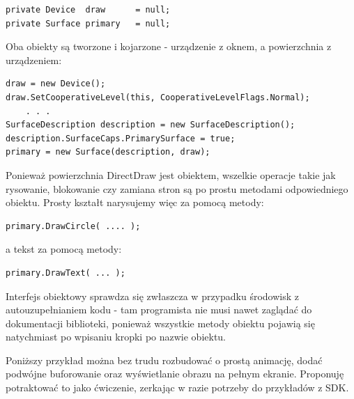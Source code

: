 \begin{scriptsize}
\begin{verbatim}
private Device  draw      = null; 
private Surface primary   = null;
\end{verbatim}
\end{scriptsize}

Oba obiekty są tworzone i kojarzone - urządzenie z oknem, a powierzchnia z urządzeniem:

\begin{scriptsize}
\begin{verbatim}
draw = new Device(); 
draw.SetCooperativeLevel(this, CooperativeLevelFlags.Normal);
	. . .
SurfaceDescription description = new SurfaceDescription(); 
description.SurfaceCaps.PrimarySurface = true; 
primary = new Surface(description, draw);
\end{verbatim}
\end{scriptsize}

Ponieważ powierzchnia DirectDraw jest obiektem, wszelkie operacje takie jak rysowanie, 
blokowanie czy zamiana stron są po prostu metodami odpowiedniego obiektu. 
Prosty kształt narysujemy więc za pomocą metody:

\begin{scriptsize}
\begin{verbatim}
primary.DrawCircle( .... );
\end{verbatim}
\end{scriptsize}

a tekst za pomocą metody:

\begin{scriptsize}
\begin{verbatim}
primary.DrawText( ... );	
\end{verbatim}
\end{scriptsize}

Interfejs obiektowy sprawdza się zwłaszcza w przypadku środowisk z autouzupełnianiem kodu - 
tam programista nie musi nawet zaglądać do dokumentacji biblioteki, ponieważ wszystkie metody 
obiektu pojawią się natychmiast po wpisaniu kropki po nazwie obiektu.

Poniższy przykład można bez trudu rozbudować o prostą animację, dodać podwójne buforowanie oraz 
wyświetlanie obrazu na pełnym ekranie. Proponuję potraktować to jako ćwiczenie, zerkając 
w razie potrzeby do przykładów z SDK. 

